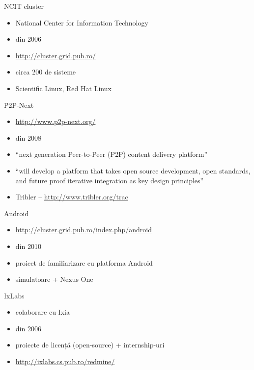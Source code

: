 \documentclass{beamer}
\begin{document}
\begin{frame}{NCIT cluster}
	\begin{itemize}
		\item National Center for Information Technology
		\item din 2006
		\item \url{http://cluster.grid.pub.ro/}
		\item circa 200 de sisteme
		\item Scientific Linux, Red Hat Linux
	\end{itemize}
\end{frame}

\begin{frame}{P2P-Next}
	\begin{itemize}
		\item \url{http://www.p2p-next.org/}
		\item din 2008
		\item ``next generation Peer-to-Peer (P2P) content delivery platform''
		\item ``will develop a platform that takes open source development,
		open standards, and future proof iterative integration as key design
		principles''
		\item Tribler -- \url{http://www.tribler.org/trac}
	\end{itemize}
\end{frame}

\begin{frame}{Android}
	\begin{itemize}
		\item \url{http://cluster.grid.pub.ro/index.php/android}
		\item din 2010
		\item proiect de familiarizare cu platforma Android
		\item simulatoare + Nexus One
	\end{itemize}
\end{frame}

\begin{frame}{IxLabs}
	\begin{itemize}
		\item colaborare cu Ixia
		\item din 2006
		\item proiecte de licență (open-source) + internship-uri
		\item \url{http://ixlabs.cs.pub.ro/redmine/}
	\end{itemize}
\end{frame}
\end{document}
